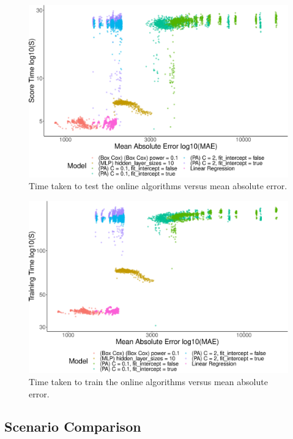 \documentclass[final,3p,times,twocolumn,numbers]{elsarticle}
\begin{document}
\begin{figure}[h]
\centering
\includegraphics[width=\columnwidth]{figures/results/online_testing_time_vs_mae_all_results_opaque.eps}
\caption{Time taken to test the online algorithms versus mean absolute error.}
\label{fig:online_test_vs_mae}
\end{figure}

\begin{figure}[h]
\centering
\includegraphics[width=\columnwidth]{figures/results/online_training_time_vs_mae_all_results_opaque.eps}
\caption{Time taken to train the online algorithms versus mean absolute error.}
\label{fig:online_train_vs_mae}
\end{figure}








\subsection{Scenario Comparison}
\end{document}
